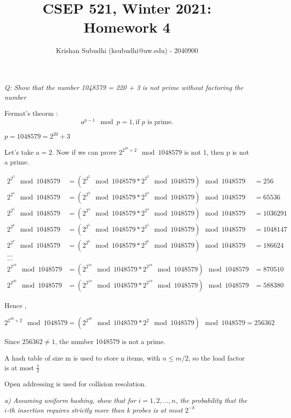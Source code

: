 \documentclass{homeworg}
\title{CSEP 521, Winter 2021: Homework 4}
\author{Krishan Subudhi (ksubudhi@uw.edu) - 2040900}
\begin{document}
\maketitle

\exercise
\emph{Q: Show that the number 1048579 = 220 + 3 is not prime without factoring the number}

Fermat's theorm : 
\[a^{p-1} \mod p = 1,  \text{if $p$ is prime.}\]

$p = 1048579 = 2^{20} + 3$

Let's take $a = 2$. Now if we can prove $2^{2^{20}+2} \mod 1048579$ is not 1, then p is not a prime.

\begin{align*}
2^{2^3} \mod 1048579 &= (2^{2^2} \mod 1048579 \ast 2^{2^2} \mod 1048579) \mod 1048579 &= 256\\
2^{2^4} \mod 1048579 &= (2^{2^3} \mod 1048579 \ast 2^{2^3} \mod 1048579) \mod 1048579 &= 65536\\
2^{2^5} \mod 1048579 &= (2^{2^4} \mod 1048579 \ast 2^{2^4} \mod 1048579) \mod 1048579 &= 1036291\\
2^{2^6} \mod 1048579 &= (2^{2^5} \mod 1048579 \ast 2^{2^5} \mod 1048579) \mod 1048579 &= 1048147\\
2^{2^7} \mod 1048579 &= (2^{2^6} \mod 1048579 \ast 2^{2^6} \mod 1048579) \mod 1048579 &= 186624\\
\texttt{...}\\
\texttt{...}\\
2^{2^{19}} \mod 1048579 &= (2^{2^{18}} \mod 1048579 \ast 2^{2^{18}} \mod 1048579) \mod 1048579 &= 870510\\
2^{2^{20}} \mod 1048579 &= (2^{2^{19}} \mod 1048579 \ast 2^{2^{19}} \mod 1048579) \mod 1048579 &= 588380
\end{align*}

Hence ,

\[
2^{2^{20}+2} \mod 1048579 = ( {2^{2^{20}} \mod 1048579 \ast 2^{2} \mod 1048579} ) \mod 1048579 = 256362
\]

Since $256362 \ne 1$, the number 1048579 is not a prime.

\newpage
\exercise

A hash table of size m is used to store n items, with $n \le m/2$, so the load factor is at most $\frac{1}{2}$

Open addressing is used for collision resolution.

\emph{a) Assuming uniform hashing, show that for $i =1, 2,. .., n$, the probability that the $i$-th insertion requires strictly more than k probes is at most $2^{-k}$}
\end{document}
